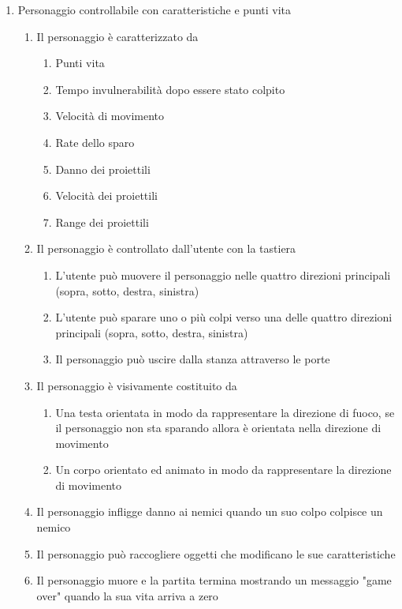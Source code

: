 \begin{enumerate}
\begin{enumerate}
    \end{enumerate}
    
    \item Personaggio controllabile con caratteristiche e punti vita
    \begin{enumerate}
        \item Il personaggio è caratterizzato da
            \begin{enumerate}
                \item Punti vita
                \item Tempo invulnerabilità dopo essere stato colpito
                \item Velocità di movimento
                \item Rate dello sparo
                \item Danno dei proiettili
                \item Velocità dei proiettili
                \item Range dei proiettili
            \end{enumerate}
        \item Il personaggio è controllato dall'utente con la tastiera
        \begin{enumerate}
            \item L'utente può muovere il personaggio nelle quattro direzioni principali (sopra, sotto, destra, sinistra)
            \item L'utente può sparare uno o più colpi verso una delle quattro direzioni principali (sopra, sotto, destra, sinistra)
            \item Il personaggio può uscire dalla stanza attraverso le porte
        \end{enumerate}
        \item Il personaggio è visivamente costituito da
        \begin{enumerate}
            \item Una testa orientata in modo da rappresentare la direzione di fuoco, se il personaggio non sta sparando allora è orientata nella direzione di movimento
            \item Un corpo orientato ed animato in modo da rappresentare la direzione di movimento
        \end{enumerate}
        \item Il personaggio infligge danno ai nemici quando un suo colpo colpisce un nemico
        \item Il personaggio può raccogliere oggetti che modificano le sue caratteristiche
        \item Il personaggio muore e la partita termina mostrando un messaggio "game over" quando la sua vita arriva a zero
    \end{enumerate}
    

\end{enumerate}
